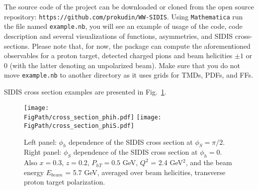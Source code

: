 \documentclass[a4paper,11pt]{article}
\def\Phperp{P_{hT}}
\newcommand*{\FigPath}{./figs}%
\newcommand*{\BibPath}{.}%
\begin{document}
The source code of the project can be downloaded or cloned from the 
open source repository: \texttt{https://github.com/prokudin/WW-SIDIS}. 
Using \texttt{Mathematica}  run the  file named \texttt{example.nb}, 
you will see an example of usage of the code, code description and 
several visualizations of functions, asymmetries, and SIDIS cross-sections. 
Please note that, for now, the package can compute the aforementioned 
observables for a proton target, detected charged pions and beam 
helicities $\pm1$ or $0$ (with the latter denoting an unpolarized beam).
Make sure that you do not move \texttt{example.nb} to another directory 
as it uses grids for TMDs, PDFs, and FFs. 

SIDIS cross section examples are presented in Fig.~\ref{fig:package}.


\begin{figure}[t]
\centering
\texttt{[image: \\FigPath/cross\_section\_phih.pdf]} 
\texttt{[image: \\FigPath/cross\_section\_phiS.pdf]} 
\caption{\label{fig:package} 
	Left panel:  
	$\phi_h$ dependence of the SIDIS cross section at $\phi_S = \pi/2$. 
	Right panel:  
	$\phi_S$ dependence of the SIDIS cross section at $\phi_h = 0$. 
	Also $x = 0.3$, $z=0.2$, $\Phperp = 0.5$ GeV, 
	$Q^2$ = 2.4 GeV$^2$, and the beam energy $E_{beam}$ = 5.7 GeV, 
	averaged over beam helicities,  transverse proton target polarization.}
\end{figure}





\end{document}

